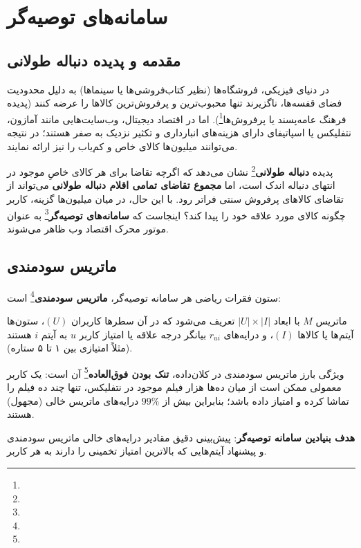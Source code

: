 \chapter{سامانه‌های توصیه‌گر \texorpdfstring{}{(Recommender Systems)}}
\label{ch:recsys}

\section{مقدمه و پدیده دنباله طولانی}
در دنیای فیزیکی، فروشگاه‌ها (نظیر کتاب‌فروشی‌ها یا سینماها) به دلیل محدودیت فضای قفسه‌ها، ناگزیرند تنها محبوب‌ترین و پرفروش‌ترین کالاها را عرضه کنند (پدیده فرهنگ عامه‌پسند یا پرفروش‌ها\footnote{}). اما در اقتصاد دیجیتال، وب‌سایت‌هایی مانند آمازون، نتفلیکس یا اسپاتیفای دارای هزینه‌های انبارداری و تکثیر نزدیک به صفر هستند؛ در نتیجه می‌توانند میلیون‌ها کالای خاص و کم‌یاب را نیز ارائه نمایند.

پدیده \textbf{دنباله طولانی}\footnote{} نشان می‌دهد که اگرچه تقاضا برای هر کالای خاصِ موجود در انتهای دنباله اندک است، اما \textbf{مجموع تقاضای تمامی اقلام دنباله طولانی} می‌تواند از تقاضای کالاهای پرفروش سنتی فراتر رود. با این حال، در میان میلیون‌ها گزینه، کاربر چگونه کالای مورد علاقه خود را پیدا کند؟ اینجاست که \textbf{سامانه‌های توصیه‌گر}\footnote{} به عنوان موتور محرک اقتصاد وب ظاهر می‌شوند.

\section{ماتریس سودمندی \texorpdfstring{}{(Utility Matrix)}}
ستون فقرات ریاضی هر سامانه توصیه‌گر، \textbf{ماتریس سودمندی}\footnote{} است:

\begin{definition}
ماتریس $M$ با ابعاد $|U| \times |I|$ تعریف می‌شود که در آن سطرها کاربران $(U)$، ستون‌ها آیتم‌ها یا کالاها $(I)$، و درایه‌های $r_{ui}$ بیانگر درجه علاقه یا امتیاز کاربر $u$ به آیتم $i$ هستند (مثلاً امتیازی بین ۱ تا ۵ ستاره).
\end{definition}

ویژگی بارز ماتریس سودمندی در کلان‌داده، \textbf{تنک بودن فوق‌العاده}\footnote{} آن است: یک کاربر معمولی ممکن است از میان ده‌ها هزار فیلم موجود در نتفلیکس، تنها چند ده فیلم را تماشا کرده و امتیاز داده باشد؛ بنابراین بیش از $99\%$ درایه‌های ماتریس خالی (مجهول) هستند.

\textbf{هدف بنیادین سامانه توصیه‌گر}: پیش‌بینی دقیق مقادیر درایه‌های خالی ماتریس سودمندی و پیشنهاد آیتم‌هایی که بالاترین امتیاز تخمینی را دارند به هر کاربر.

